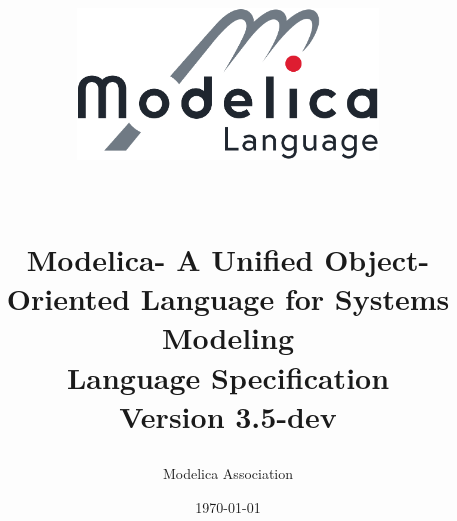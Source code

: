 \newcommand{\textgreatereq}{$\geq$}
\newcommand{\textlesseq}{$\leq$}

\def\subsectionautorefname{section}
\def\subsubsectionautorefname{section}
\def\paragraphautorefname{section}
\def\subparagraphautorefname{section}


\title{
\ifpdf
\begin{center}
\includegraphics[width=8cm]{Modelica_Language}
\end{center}
~\\[2\baselineskip]
\fi
Modelica\textsuperscript\textregistered - A Unified Object-Oriented Language for Systems
Modeling\\[2\baselineskip]
Language Specification\\[2\baselineskip]
Version 3.5-dev}
\date{\today}
\author{Modelica Association}
